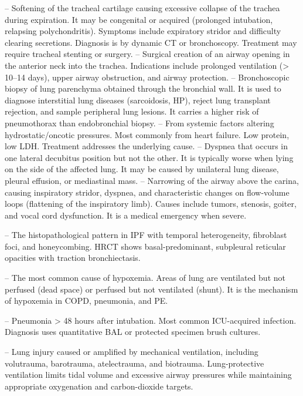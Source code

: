 -- Softening of the tracheal cartilage causing excessive collapse of the trachea during expiration. It may be congenital or acquired (prolonged intubation, relapsing polychondritis). Symptoms include expiratory stridor and difficulty clearing secretions. Diagnosis is by dynamic CT or bronchoscopy. Treatment may require tracheal stenting or surgery.
-- Surgical creation of an airway opening in the anterior neck into the trachea. Indications include prolonged ventilation (> 10--14 days), upper airway obstruction, and airway protection.
-- Bronchoscopic biopsy of lung parenchyma obtained through the bronchial wall. It is used to diagnose interstitial lung diseases (sarcoidosis, HP), reject lung transplant rejection, and sample peripheral lung lesions. It carries a higher risk of pneumothorax than endobronchial biopsy.
-- From systemic factors altering hydrostatic/oncotic pressures. Most commonly from heart failure. Low protein, low LDH. Treatment addresses the underlying cause.
-- Dyspnea that occurs in one lateral decubitus position but not the other. It is typically worse when lying on the side of the affected lung. It may be caused by unilateral lung disease, pleural effusion, or mediastinal mass.
-- Narrowing of the airway above the carina, causing inspiratory stridor, dyspnea, and characteristic changes on flow-volume loops (flattening of the inspiratory limb). Causes include tumors, stenosis, goiter, and vocal cord dysfunction. It is a medical emergency when severe.

-- The histopathological pattern in IPF with temporal heterogeneity, fibroblast foci, and honeycombing. HRCT shows basal-predominant, subpleural reticular opacities with traction bronchiectasis.

-- The most common cause of hypoxemia. Areas of lung are ventilated but not perfused (dead space) or perfused but not ventilated (shunt). It is the mechanism of hypoxemia in COPD, pneumonia, and PE.

-- Pneumonia > 48 hours after intubation. Most common ICU-acquired infection. Diagnosis uses quantitative BAL or protected specimen brush cultures.

-- Lung injury caused or amplified by mechanical ventilation, including volutrauma, barotrauma, atelectrauma, and biotrauma. Lung-protective ventilation limits tidal volume and excessive airway pressures while maintaining appropriate oxygenation and carbon-dioxide targets.

